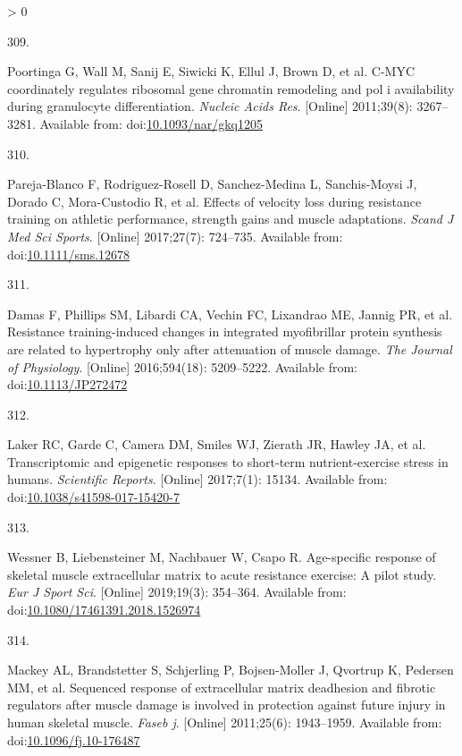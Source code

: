 \documentclass[twoside,10pt]{gihclass} %
\newlength{\cslhangindent}
\newlength{\csllabelwidth}
\newenvironment{CSLReferences}[3] %
 {%
  \setlength{\parindent}{0pt}
  \ifodd #1 \everypar{\setlength{\hangindent}{\cslhangindent}}\ignorespaces\fi
  \ifnum #2 > 0
  \setlength{\parskip}{#2\baselineskip}
  \fi
 }%
 {}
\newcommand{\CSLLeftMargin}[1]{\parbox[t]{\maxof{\widthof{#1}}{\csllabelwidth}}{#1}}
\newcommand{\CSLRightInline}[1]{\parbox[t]{\linewidth}{#1}}
\begin{document}
\begin{CSLReferences}{0}{0}
\leavevmode\hypertarget{ref-RN1832}{}%
\CSLLeftMargin{309. }
\CSLRightInline{Poortinga G, Wall M, Sanij E, Siwicki K, Ellul J, Brown D, et al. C-MYC coordinately regulates ribosomal gene chromatin remodeling and pol i availability during granulocyte differentiation. \emph{Nucleic Acids Res}. {[}Online{]} 2011;39(8): 3267--3281. Available from: doi:\href{https://doi.org/10.1093/nar/gkq1205}{10.1093/nar/gkq1205}}

\leavevmode\hypertarget{ref-RN2217}{}%
\CSLLeftMargin{310. }
\CSLRightInline{Pareja-Blanco F, Rodriguez-Rosell D, Sanchez-Medina L, Sanchis-Moysi J, Dorado C, Mora-Custodio R, et al. Effects of velocity loss during resistance training on athletic performance, strength gains and muscle adaptations. \emph{Scand J Med Sci Sports}. {[}Online{]} 2017;27(7): 724--735. Available from: doi:\href{https://doi.org/10.1111/sms.12678}{10.1111/sms.12678}}

\leavevmode\hypertarget{ref-RN2144}{}%
\CSLLeftMargin{311. }
\CSLRightInline{Damas F, Phillips SM, Libardi CA, Vechin FC, Lixandrao ME, Jannig PR, et al. Resistance training-induced changes in integrated myofibrillar protein synthesis are related to hypertrophy only after attenuation of muscle damage. \emph{The Journal of Physiology}. {[}Online{]} 2016;594(18): 5209--5222. Available from: doi:\href{https://doi.org/10.1113/JP272472}{10.1113/JP272472}}

\leavevmode\hypertarget{ref-RN2401}{}%
\CSLLeftMargin{312. }
\CSLRightInline{Laker RC, Garde C, Camera DM, Smiles WJ, Zierath JR, Hawley JA, et al. Transcriptomic and epigenetic responses to short-term nutrient-exercise stress in humans. \emph{Scientific Reports}. {[}Online{]} 2017;7(1): 15134. Available from: doi:\href{https://doi.org/10.1038/s41598-017-15420-7}{10.1038/s41598-017-15420-7}}

\leavevmode\hypertarget{ref-RN2451}{}%
\CSLLeftMargin{313. }
\CSLRightInline{Wessner B, Liebensteiner M, Nachbauer W, Csapo R. Age-specific response of skeletal muscle extracellular matrix to acute resistance exercise: A pilot study. \emph{Eur J Sport Sci}. {[}Online{]} 2019;19(3): 354--364. Available from: doi:\href{https://doi.org/10.1080/17461391.2018.1526974}{10.1080/17461391.2018.1526974}}

\leavevmode\hypertarget{ref-RN2453}{}%
\CSLLeftMargin{314. }
\CSLRightInline{Mackey AL, Brandstetter S, Schjerling P, Bojsen-Moller J, Qvortrup K, Pedersen MM, et al. Sequenced response of extracellular matrix deadhesion and fibrotic regulators after muscle damage is involved in protection against future injury in human skeletal muscle. \emph{Faseb j}. {[}Online{]} 2011;25(6): 1943--1959. Available from: doi:\href{https://doi.org/10.1096/fj.10-176487}{10.1096/fj.10-176487}}


\end{CSLReferences}
\end{document}
